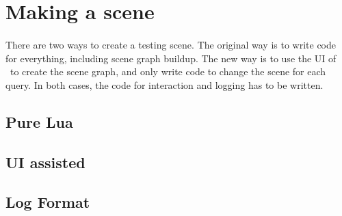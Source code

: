 \section{Making a scene}
\paragraph{}
There are two ways to create a testing scene.
The original way is to write code for everything, including scene graph buildup.
The new way is to use the UI of \ER\ to create the scene graph,
and only write code to change the scene for each query.
In both cases, the code for interaction and logging has to be written.


\subsection{Pure Lua}
\paragraph{}

\subsection{UI assisted}
\paragraph{}


\subsection{Log Format}
\paragraph{}


